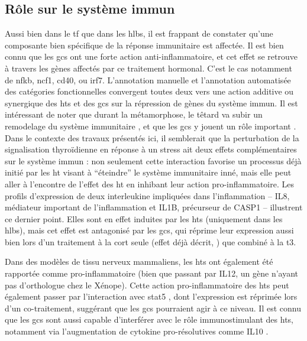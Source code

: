 \documentclass[../main.tex]{subfiles}
\begin{document}
	\subsection{Rôle sur le système immun}
		Aussi bien dans le \gls{tf} que dans les \glspl{hlb}, il est frappant de constater qu'une composante bien spécifique de la réponse immunitaire est affectée.
		Il est bien connu que les \glspl{gc} ont une forte action anti-inflammatoire, et cet effet se retrouve à travers les gènes affectés par ce traitement hormonal.
		C'est le cas notamment de \gls{nfkb}, \gls{ncf1}, \gls{cd40}, ou \gls{irf7}.
		L'annotation manuelle et l'annotation automatisée des catégories fonctionnelles convergent toutes deux vers une action additive ou synergique des \glspl{ht} et des \glspl{gc} sur la répression de gènes du système immun.
		Il est intéressant de noter que durant la métamorphose, le têtard va subir un remodelage du système immunitaire \citep{DuPasquier1989,Flajnik1987}, et que les \glspl{gc} y jouent un rôle important \citep{Rollins-Smith1997}.
		Dans le contexte des travaux présentés ici, il semblerait que la perturbation de la signalisation thyroïdienne en réponse à un stress ait deux effets complémentaires sur le système immun :
		non seulement cette interaction favorise un processus déjà initié par les \gls{ht} visant à ``éteindre'' le système immunitaire inné, mais elle peut aller à l'encontre de l'effet des \gls{ht} en inhibant leur action pro-inflammatoire.
		Les profils d'expression de deux interleukine impliquées dans l'inflammation – IL8, médiateur important de l'inflammation et IL1B, précurseur de CASP1 – illustrent ce dernier point.
		Elles sont en effet induites par les \glspl{ht} (uniquement dans les \glspl{hlb}), mais cet effet est antagonisé par les \glspl{gc}, qui réprime leur expression aussi bien lors d'un traitement à la \gls{cort} seule (effet déjà décrit, \citealp{Nissen2000}) que combiné à la \gls{t3}.
		\par
		Dans des modèles de tissu nerveux mammaliens, les \glspl{ht} ont également été rapportée comme pro-inflammatoire \citep{Tamura1999,Montesinos2012} (bien que passant par IL12, un gène n'ayant pas d'orthologue chez le Xénope).
		Cette action pro-inflammatoire des \glspl{ht} peut également passer par l’interaction avec \gls{stat5} \citep{Favre-Young2000}, dont l'expression est réprimée lors d'un co-traitement, suggérant que les \glspl{gc} pourraient agir à ce niveau.
		Il est connu que les \glspl{gc} sont aussi capable d'interférer avec le rôle immunostimulant des \glspl{ht}, notamment via l'augmentation de cytokine pro-résolutives comme IL10 \citep{Montesinos2012}.
\end{document}
